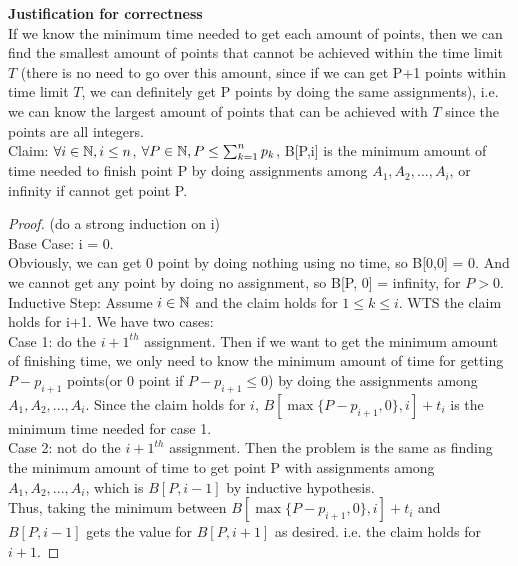 \documentclass[11pt]{article}
\begin{document}
\begin{enumerate}
\begin{enumerate}
            
            \textbf{Justification for correctness}\\
            If we know the minimum time needed to get each amount of points, then we can find the smallest amount of points that cannot be achieved within the time limit $T$ (there is no need to go over this amount, since if we can get P+1 points within time limit $T$, we can definitely get P points by doing the same assignments), i.e. we can know the largest amount of points that can be achieved with $T$ since the points are all integers.\\[2ex]
            Claim: $\forall i \in \mathbb N, i \leq n$, $\forall P\in \mathbb N, P \leq \sum_{k=1}^{n}p_k$, B[P,i] is the minimum amount of time needed to finish point P by doing assignments among $A_1, A_2, ..., A_i$, or infinity if cannot get point P.
            \begin{proof}(do a strong induction on i)\\
                Base Case: i = 0.\\
                    Obviously, we can get 0 point by doing nothing using no time, so B[0,0] = 0. And we cannot get any point by doing no assignment, so B[P, 0] = infinity, for $P > 0$.\\
                Inductive Step: Assume $i\in \mathbb N$ and the claim holds for $1\leq k \leq i$. WTS the claim holds for i+1. We have two cases: \\
                Case 1: do the $i+1^{th}$ assignment. Then if we want to get the minimum amount of finishing time, we only need to know the minimum amount of time for getting $P - p_{i+1}$ points(or 0 point if $P - p_{i+1} \leq 0$) by doing the assignments among $A_1, A_2, ..., A_i$. Since the claim holds for $i$,  $B[\max\{P - p_{i+1}, 0\},  i] + t_i$ is the minimum time needed for case 1.\\
                Case 2: not do the $i+1^{th}$ assignment. Then the problem is the same as finding the minimum amount of time to get point P with assignments among $A_1, A_2, ..., A_i$, which is $B[P, i-1]$ by inductive hypothesis.\\
                Thus, taking the minimum between $B[\max\{P - p_{i+1}, 0\},  i] + t_i$ and $B[P, i-1]$ gets the value for $B[P, i+1]$ as desired. i.e. the claim holds for $i+1$.
                

\end{proof}
\end{enumerate}
\end{enumerate}
\end{document}
